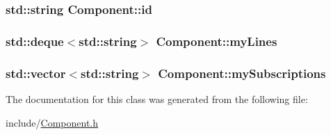\subsubsection[{\texorpdfstring{id}{id}}]{\setlength{\rightskip}{0pt plus 5cm}std\+::string Component\+::id}\hypertarget{classComponent_afdcb5d4ea092afe60818fe3d116f8c43}{}\label{classComponent_afdcb5d4ea092afe60818fe3d116f8c43}
\subsubsection[{\texorpdfstring{my\+Lines}{myLines}}]{\setlength{\rightskip}{0pt plus 5cm}std\+::deque$<$std\+::string$>$ Component\+::my\+Lines}\hypertarget{classComponent_a9dfae8578328e11379a3c10b947655f2}{}\label{classComponent_a9dfae8578328e11379a3c10b947655f2}
\subsubsection[{\texorpdfstring{my\+Subscriptions}{mySubscriptions}}]{\setlength{\rightskip}{0pt plus 5cm}std\+::vector$<$std\+::string$>$ Component\+::my\+Subscriptions}\hypertarget{classComponent_abcfcf60b25a608e476c868a6df83764c}{}\label{classComponent_abcfcf60b25a608e476c868a6df83764c}


The documentation for this class was generated from the following file\+:\begin{DoxyCompactItemize}
\item 
include/\hyperlink{Component_8h}{Component.\+h}\end{DoxyCompactItemize}
